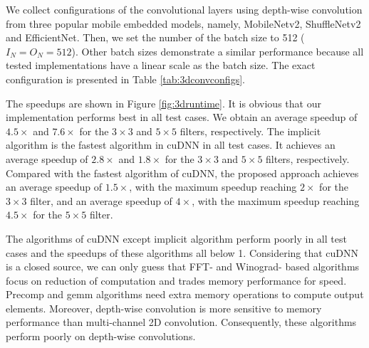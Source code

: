We collect configurations of the convolutional layers using depth-wise convolution from three popular mobile embedded models,
namely, MobileNetv2, ShuffleNetv2 and EfficientNet.
Then, we set the number of the batch size to 512 ($I_N=O_N=512$). Other batch sizes demonstrate a similar performance because all tested implementations have a linear scale as the batch size. The exact configuration is presented in Table \ref{tab:3dconvconfigs}.

The speedups are shown in Figure \ref{fig:3druntime}. It is obvious that our implementation performs best in all test cases. We obtain an average speedup of $4.5\times$ and $7.6\times$ for the $3 \times 3$ and $5 \times 5$ filters, respectively. The implicit algorithm is the fastest algorithm in cuDNN in all test cases. It achieves an average speedup of $2.8\times$ and $1.8\times$ for the $3 \times 3$ and $5 \times 5$ filters, respectively. Compared with the fastest algorithm of cuDNN, the proposed approach achieves an average speedup of $1.5\times$, with the maximum speedup reaching $2\times$ for the $3 \times 3$ filter, and an average speedup of $4\times$, with the maximum speedup reaching $4.5\times$ for the $5 \times 5$ filter.

The algorithms of cuDNN except implicit algorithm perform poorly in all test cases and the speedups of these algorithms all below 1. Considering that cuDNN is a closed source, we can only guess that FFT- and Winograd- based algorithms focus on reduction of computation and trades memory performance for speed. Precomp and gemm algorithms need extra memory operations to compute output elements. Moreover, depth-wise convolution is more sensitive to memory performance than multi-channel 2D convolution. Consequently, these algorithms perform poorly on depth-wise convolutions.
 
